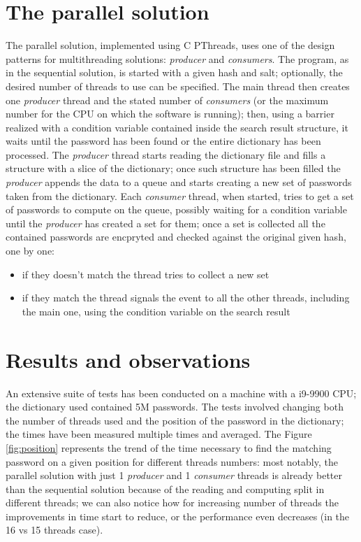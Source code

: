 \documentclass[10pt,twocolumn,letterpaper]{article}
\begin{document}
\section{The parallel solution}

    The parallel solution, implemented using C PThreads, uses one of the design
    patterns for multithreading solutions: \emph{producer} and \emph{consumers}.
    The program, as in the sequential solution, is started with a given hash and
    salt; optionally, the desired number of threads to use can be specified.
    The main thread then creates one \emph{producer} thread and the stated number of
    \emph{consumers} (or the maximum number for the CPU on which the software is running);
    then, using a barrier realized with a condition variable contained inside the
    search result structure, it waits until the password has been found or the entire
    dictionary has been processed.
    The \emph{producer} thread starts reading the dictionary file and fills a structure with
    a slice of the dictionary; once such structure has been filled the \emph{producer}
    appends the data to a queue and starts creating a new set of passwords taken
    from the dictionary.
    Each \emph{consumer} thread, when started, tries to get a set of passwords to compute on
    the queue, possibly waiting for a condition variable until the \emph{producer} has
    created a set for them; once a set is collected all the contained passwords are
    encpryted and checked against the original given hash, one by one:

    \begin{itemize}
        \item if they doesn’t match the thread tries to collect a new set
        \item if they match the thread signals the event to all the other threads,
              including the main one, using the condition variable on the search result
    \end{itemize}

\section{Results and observations}

    An extensive suite of tests has been conducted on a machine with a i9-9900 CPU;
    the dictionary used contained 5M passwords.
    The tests involved changing both the number of threads used and the position of
    the password in the dictionary; the times have been measured multiple times and
    averaged.
    The Figure \ref{fig:position} represents the trend of the time necessary to find the
    matching password on a given position for different threads numbers: most notably, the
    parallel solution with just 1 \emph{producer} and 1 \emph{consumer} threads is already
    better than the sequential solution because of the reading and computing split in
    different threads; we can also notice how for increasing number of threads the
    improvements in time start to reduce, or the performance even decreases (in the
    16 vs 15 threads case).
\end{document}
